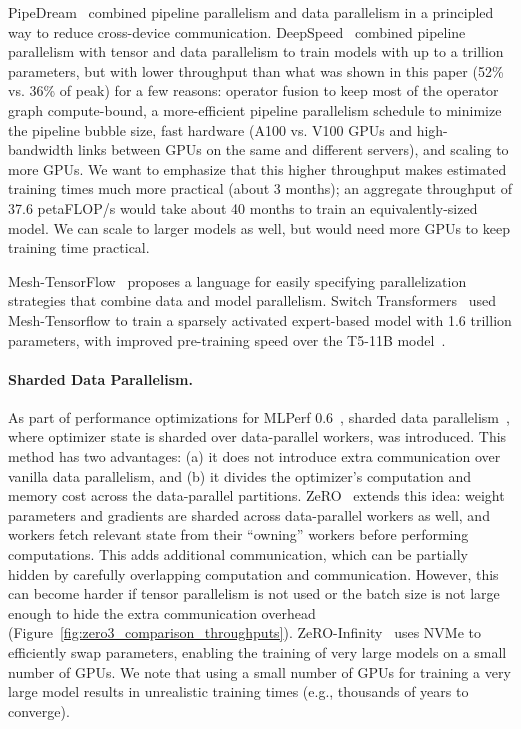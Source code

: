 PipeDream~\cite{narayanan2019pipedream} combined pipeline parallelism and data parallelism in a principled way to reduce cross-device communication. DeepSpeed~\cite{deepspeed3Dparallelism} combined pipeline parallelism with tensor and data parallelism to train models with up to a trillion parameters, but with lower throughput than what was shown in this paper (52\% vs. 36\% of peak) for a few reasons: operator fusion to keep most of the operator graph compute-bound, a more-efficient pipeline parallelism schedule to minimize the pipeline bubble size, fast hardware (A100 vs. V100 GPUs and high-bandwidth links between GPUs on the same and different servers), and scaling to more GPUs. We want to emphasize that this higher throughput makes estimated training times much more practical (about 3 months); an aggregate throughput of 37.6 petaFLOP/s would take about 40 months to train an equivalently-sized model. We can scale to larger models as well, but would need more GPUs to keep training time practical.

Mesh-TensorFlow~\cite{mesh_tf} proposes a language for easily specifying parallelization strategies that combine data and model parallelism. Switch Transformers~\cite{fedus2021switch} used Mesh-Tensorflow to train a sparsely activated expert-based model with 1.6 trillion parameters, with improved pre-training speed over the T5-11B model~\cite{T5}.

\paragraph{Sharded Data Parallelism.} As part of performance optimizations for MLPerf 0.6~\cite{mattson2019mlperf}, sharded data parallelism~\cite{kumar2019scale, xu2020automatic}, where optimizer state is sharded over data-parallel workers, was introduced. This method has two advantages: (a) it does not introduce extra communication over vanilla data parallelism, and (b) it divides the optimizer's computation and memory cost across the data-parallel partitions. ZeRO~\cite{rajbhandari2019zero,rajbhandari2021zero} extends this idea: weight parameters and gradients are sharded across data-parallel workers as well, and workers fetch relevant state from their ``owning'' workers before performing computations. This adds additional communication, which can be partially hidden by carefully overlapping computation and communication. However, this can become harder if tensor parallelism is not used or the batch size is not large enough to hide the extra communication overhead (Figure~\ref{fig:zero3_comparison_throughputs}). ZeRO-Infinity~\cite{rajbhandari2021zero} uses NVMe to efficiently swap parameters, enabling the training of very large models on a small number of GPUs. We note that using a small number of GPUs for training a very large model results in unrealistic training times (e.g., thousands of years to converge).

